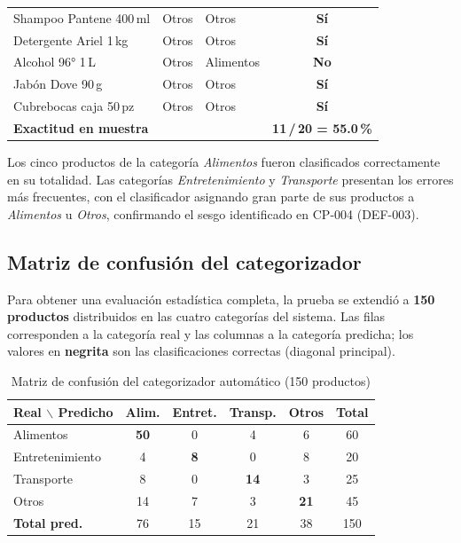 \begin{table}[H]
\begin{tabular}{l l l c}
    Shampoo Pantene 400\,ml  & Otros           & Otros           & \textcolor{OliveGreen}{\textbf{Sí}} \\
    Detergente Ariel 1\,kg   & Otros           & Otros           & \textcolor{OliveGreen}{\textbf{Sí}} \\
    Alcohol 96° 1\,L         & Otros           & Alimentos       & \textcolor{BrickRed}{\textbf{No}}   \\
    Jabón Dove 90\,g         & Otros           & Otros           & \textcolor{OliveGreen}{\textbf{Sí}} \\
    Cubrebocas caja 50\,pz   & Otros           & Otros           & \textcolor{OliveGreen}{\textbf{Sí}} \\
    \midrule
    \multicolumn{3}{l}{\textbf{Exactitud en muestra}} & \textbf{11\,/\,20 = 55.0\,\%} \\
    \bottomrule
  \end{tabular}
\end{table}

Los cinco productos de la categoría \textit{Alimentos} fueron clasificados correctamente en su totalidad. Las categorías \textit{Entretenimiento} y \textit{Transporte} presentan los errores más frecuentes, con el clasificador asignando gran parte de sus productos a \textit{Alimentos} u \textit{Otros}, confirmando el sesgo identificado en CP-004 (DEF-003).

\subsection{Matriz de confusión del categorizador}

Para obtener una evaluación estadística completa, la prueba se extendió a \textbf{150 productos} distribuidos en las cuatro categorías del sistema. Las filas corresponden a la categoría real y las columnas a la categoría predicha; los valores en \textbf{negrita} son las clasificaciones correctas (diagonal principal).

\begin{table}[H]
  \centering
  \small
  \caption{Matriz de confusión del categorizador automático (150 productos)}
  \label{tab:matriz-confusion}
  \begin{tabular}{l c c c c c}
    \toprule
    \textbf{Real $\backslash$ Predicho} &
    \textbf{Alim.} & \textbf{Entret.} & \textbf{Transp.} & \textbf{Otros} & \textbf{Total} \\
    \midrule
    Alimentos       & \textbf{50} &  0 &  4 &  6 &  60 \\
    Entretenimiento &           4 &  \textbf{8} &  0 &  8 &  20 \\
    Transporte      &           8 &  0 & \textbf{14} &  3 &  25 \\
    Otros           &          14 &  7 &  3 & \textbf{21} &  45 \\
    \midrule
    \textbf{Total pred.} & 76 & 15 & 21 & 38 & 150 \\
    \bottomrule
  \end{tabular}
\end{table}

